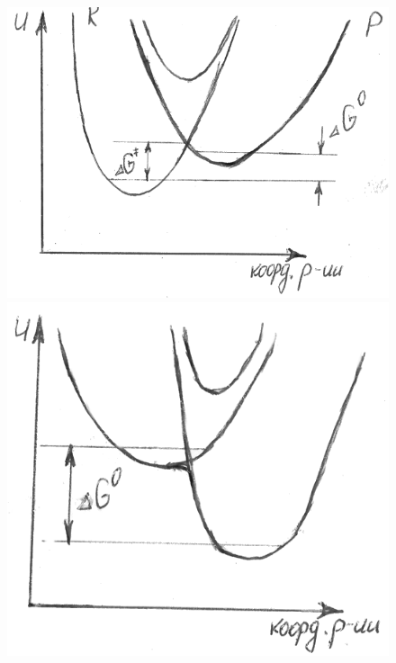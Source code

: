 \begin{lecture}
\begin{lecSection}
	\begin{figure}[H]
	\begin{minipage}[h]{0.35\linewidth}
		\centering\includegraphics[width=\linewidth]{lecture_04/new_graph1}
	\end{minipage}
	\hfill
	\begin{minipage}[h]{0.30\linewidth}
		\centering\includegraphics[width=\linewidth]{lecture_04/new_graph2}
	\end{minipage}
	\hfill
	\begin{minipage}[h]{0.28\linewidth}

\end{minipage}
\end{figure}
\end{lecSection}
\end{lecture}
